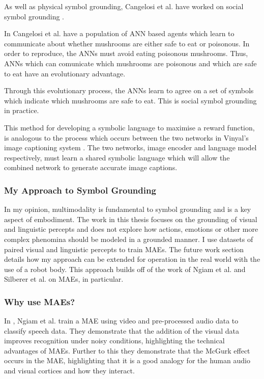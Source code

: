 As well as physical symbol grounding, Cangelosi et al. have worked on social symbol grounding \cite{cangelosi2001adaptive, cangelosi2002symbol, cangelosi1998emergence, horst2019object, cangelosi2018speech, cangelosi2008italk, broz2014italk}.

In \cite{cangelosi1998emergence} Cangelosi et al. have a population of \ac{ANN} based agents which learn to communicate about whether mushrooms are either safe to eat or poisonous. In order to reproduce, the \acp{ANN} must avoid eating poisonous mushrooms. Thus, \acp{ANN} which can comunicate which mushrooms are poisonous and which are safe to eat have an evolutionary advantage. 

Through this evolutionary process, the \acp{ANN} learn to agree on a set of symbols which indicate which mushrooms are safe to eat. This is social symbol grounding in practice. 

This method for developing a symbolic language to maximise a reward function, is analogous to the process which occurs between the two networks in Vinyal's image captioning system \cite{vinyals2015show}.  The two networks, image encoder and language model respectively, must learn a shared symbolic language which will allow the combined network to generate accurate image captions.


\subsubsection{My Approach to Symbol Grounding}

In my opinion, multimodality is fundamental to symbol grounding and is a key aspect of embodiment. The work in this thesis focuses on the grounding of visual and linguistic percepts and does not explore how actions, emotions or other more complex phenomina should be modeled in a grounded manner. I use datasets of paired visual and linguistic percepts to train \acp{MAE}. The future work section details how my approach can be extended for operation in the real world with the use of a robot body. This approach builds off of the work of Ngiam et al. \cite{ngiam2011multimodal} and Silberer et al.\cite{silberer2014learning} on \acp{MAE}, in particular.

\subsubsection{Why use MAEs?}
In \cite{ngiam2011multimodal}, Ngiam et al. train a \ac{MAE} using video and pre-processed audio data to classify speech data. They demonstrate that the addition of the visual data improves recognition under noisy conditions, highlighting the technical advantages of \acp{MAE}. Further to this they demonstrate that the McGurk effect \cite{mcgurk1976hearing} occurs in the \ac{MAE}, highlighting that it is a good analogy for the human audio and visual cortices and how they interact.

